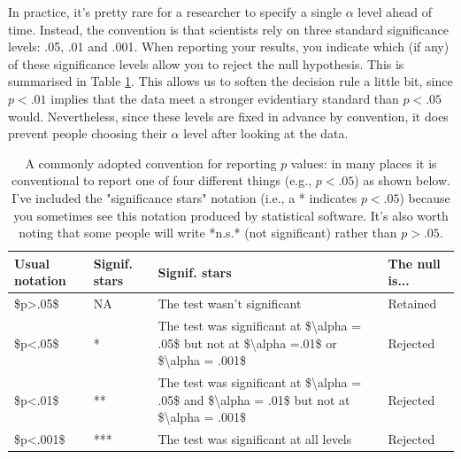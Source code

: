\documentclass[
]{book}
\begin{document}
In practice, it's pretty rare for a researcher to specify a single \(\alpha\) level ahead of time. Instead, the convention is that scientists rely on three standard significance levels: .05, .01 and .001. When reporting your results, you indicate which (if any) of these significance levels allow you to reject the null hypothesis. This is summarised in Table \ref{tab:pvaltable}. This allows us to soften the decision rule a little bit, since \(p<.01\) implies that the data meet a stronger evidentiary standard than \(p<.05\) would. Nevertheless, since these levels are fixed in advance by convention, it does prevent people choosing their \(\alpha\) level after looking at the data.

\begin{table}

\caption{\label{tab:pvaltable}A commonly adopted convention for reporting $p$ values: in many places it is conventional to report one of four different things (e.g., $p<.05$) as shown below. I've included the "significance stars" notation (i.e., a * indicates $p<.05$) because you sometimes see this notation produced by statistical software. It's also worth noting that some people will write *n.s.* (not significant) rather than $p>.05$.}
\centering
\begin{tabular}[t]{l|l|l|l}
\hline
Usual notation & Signif. stars & Signif. stars & The null is...\\
\hline
\$p>.05\$ & NA & The test wasn't significant & Retained\\
\hline
\$p<.05\$ & * & The test was significant at \$\textbackslash{}alpha = .05\$ but not at \$\textbackslash{}alpha =.01\$ or \$\textbackslash{}alpha = .001\$ & Rejected\\
\hline
\$p<.01\$ & ** & The test was significant at \$\textbackslash{}alpha = .05\$  and \$\textbackslash{}alpha = .01\$ but not at  \$\textbackslash{}alpha = .001\$ & Rejected\\
\hline
\$p<.001\$ & *** & The test was significant at all levels & Rejected\\
\hline
\end{tabular}
\end{table}
\end{document}
